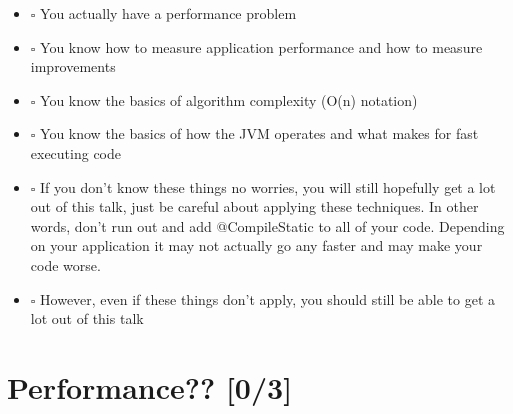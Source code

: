 \documentclass[11pt]{article}
\begin{document}
\begin{itemize}
\item $\square$ You actually have a performance problem

\item $\square$ You know how to measure application performance and how to measure improvements

\item $\square$ You know the basics of algorithm complexity (O(n) notation)

\item $\square$ You know the basics of how the JVM operates and what makes for fast executing code

\item $\square$ If you don't know these things no worries, you will still hopefully get a lot out of this talk, just be careful about applying these techniques. In other words, don't run out and add @CompileStatic to all of your code. Depending on your application it may not actually go any faster and may make your code worse.

\item $\square$ However, even if these things don't apply, you should still be able to get a lot out of this talk
\end{itemize}

\section{Performance?? [0/3]}
\label{sec:orgheadline3}
\end{document}

